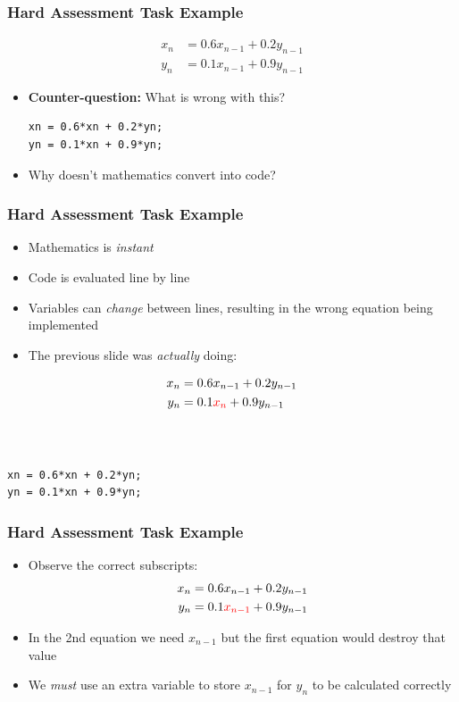 \documentclass[14pt]{beamer}
\begin{document}
\begin{frame}[fragile]
\frametitle{Hard Assessment Task Example}
\vspace{-5mm}
\begin{align*}
x_n &= 0.6x_{n-1} + 0.2y_{n-1}\\
y_n &= 0.1x_{n-1} + 0.9y_{n-1}
\end{align*}
\vspace{-6mm}
\begin{itemize}
\item \textbf{Counter-question:} What is wrong with this?
\begin{lstlisting}[style=CStyle]
xn = 0.6*xn + 0.2*yn;
yn = 0.1*xn + 0.9*yn;
\end{lstlisting}
\pause
\item Why doesn't mathematics convert into code?
\end{itemize}
\end{frame}

\begin{frame}[fragile]
\frametitle{Hard Assessment Task Example}
\begin{itemize}
\item Mathematics is \textit{instant}
\pause
\item Code is evaluated line by line
\pause
\item Variables can \textit{change} between lines, resulting in the wrong equation being implemented
\item The previous slide was \textit{actually} doing:
\end{itemize}

\begin{multicols}{2}
\begin{align*}
x_n &= 0.6x_{n-1} + 0.2y_{n-1}\\
y_n &= 0.1\textcolor{red}{x_{n}} + 0.9y_{n-1}
\end{align*}
~\\~\\
\begin{lstlisting}[style=pseudo]
xn = 0.6*xn + 0.2*yn;
yn = 0.1*xn + 0.9*yn;
\end{lstlisting}
\end{multicols}


\end{frame}

\begin{frame}
\frametitle{Hard Assessment Task Example}
\begin{itemize}
\item Observe the correct subscripts:
\begin{align*}
x_n &= 0.6x_{n-1} + 0.2y_{n-1}\\
y_n &= 0.1\textcolor{red}{x_{n-1}} + 0.9y_{n-1}
\end{align*}
\item In the 2nd equation we need $x_{n-1}$ but the first equation would destroy that value
\item We \textit{must} use an extra variable to store $x_{n-1}$ for $y_n$ to be calculated correctly
\end{itemize}
\end{frame}
\end{document}
